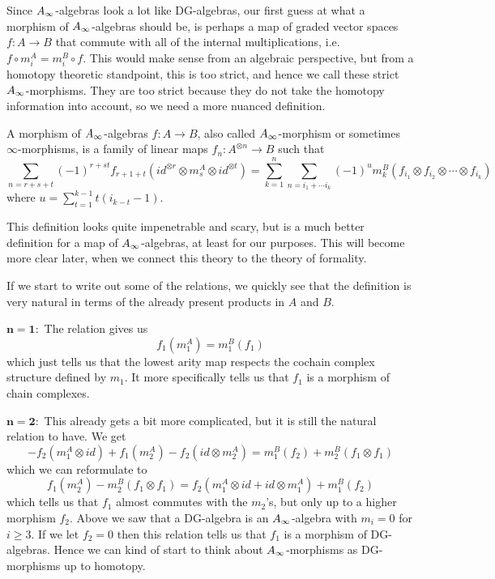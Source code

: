 Since $\A$-algebras look a lot like DG-algebras, our first guess at what a morphism of $\A$-algebras should be, is perhaps a map of graded vector spaces $f:A\longrightarrow B$ that commute with all of the internal multiplications, i.e. $f\circ m^A_i = m^B_i\circ f$. This would make sense from an algebraic perspective, but from a homotopy theoretic standpoint, this is too strict, and hence we call these strict $\A$-morphisms. They are too strict because they do not take the homotopy information into account, so we need a more nuanced definition. 

\begin{definition}[$\A$-morphism]
\label{def:A_infinity-morphism}
A morphism of $\A$-algebras $f:A\rightarrow B$, also called $\A$-morphism or sometimes $\infty$-morphisms, is a family of linear maps $f_n:A^{\otimes n}\rightarrow B$ such that 
\begin{equation*}
    \sum_{n = r+s+t}(-1)^{r+st}f_{r+1+t}(id^{\otimes r}\otimes m_s^A \otimes id^{\otimes t}) = \sum_{k=1}^{n}\sum_{n=i_1+\cdots i_k}(-1)^{u} m_k^B(f_{i_1}\otimes f_{i_2}\otimes \cdots \otimes f_{i_k})
\end{equation*}
where $u=\displaystyle \sum_{t=1}^{k-1}t(i_{k-t}-1)$.
\end{definition}

This definition looks quite impenetrable and scary, but is a much better definition for a map of $\A$-algebras, at least for our purposes. This will become more clear later, when we connect this theory to the theory of formality.  

If we start to write out some of the relations, we quickly see that the definition is very natural in terms of the already present products in $A$ and $B$. 

$\mathbf{n=1:}$ The relation gives us
\begin{equation*}
    f_1(m_1^A) = m_1^B(f_1)
\end{equation*}
which just tells us that the lowest arity map respects the cochain complex structure defined by $m_1$. It more specifically tells us that $f_1$ is a morphism of chain complexes. 

$\mathbf{n=2:}$ This already gets a bit more complicated, but it is still the natural relation to have. We get
\begin{equation*}
    -f_2(m_1^A\otimes id)+f_1(m_2^A)-f_2(id\otimes m_2^A) = m_1^B(f_2)+m_2^B(f_1\otimes f_1)
\end{equation*}
which we can reformulate to 
\begin{equation*}
    f_1(m_2^A)-m_2^B(f_1\otimes f_1) = f_2(m_1^A\otimes id + id\otimes m_1^A) + m_1^B(f_2)
\end{equation*}
which tells us that $f_1$ almost commutes with the $m_2$'s, but only up to a higher morphism $f_2$. Above we saw that a DG-algebra is an $\A$-algebra with $m_i=0$ for $i\geq 3$. If we let $f_2=0$ then this relation tells us that $f_1$ is a morphism of DG-algebras. Hence we can kind of start to think about $\A$-morphisms as DG-morphisms up to homotopy.  

